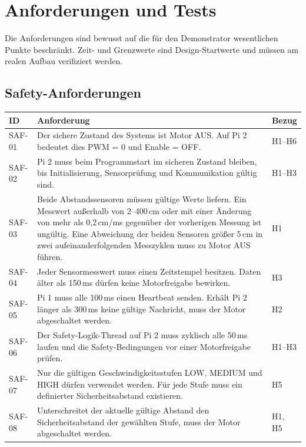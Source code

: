 \clearpage
\section{Anforderungen und Tests}
\label{sec:requirements}

Die Anforderungen sind bewusst auf die für den Demonstrator wesentlichen
Punkte beschränkt. Zeit- und Grenzwerte sind Design-Startwerte und müssen am
realen Aufbau verifiziert werden.

\subsection{Safety-Anforderungen}

\begin{table}[H]
    \centering
    \small
    \begin{tabularx}{\textwidth}{@{}p{1.5cm}Yp{2.0cm}@{}}
        \toprule
        \textbf{ID} & \textbf{Anforderung} & \textbf{Bezug} \\
        \midrule
        SAF-01 & Der sichere Zustand des Systems ist Motor AUS. Auf Pi 2 bedeutet dies PWM = 0 und Enable = OFF. & H1--H6 \\
        SAF-02 & Pi 2 muss beim Programmstart im sicheren Zustand bleiben, bis Initialisierung, Sensorprüfung und Kommunikation gültig sind. & H1--H3 \\
        SAF-03 & Beide Abstandssensoren müssen gültige Werte liefern. Ein Messwert außerhalb von 2--400\,cm oder mit einer Änderung von mehr als 0{,}2\,cm/ms gegenüber der vorherigen Messung ist ungültig. Eine Abweichung der beiden Sensoren größer 5\,cm in zwei aufeinanderfolgenden Messzyklen muss zu Motor AUS führen. & H1 \\
        SAF-04 & Jeder Sensormesswert muss einen Zeitstempel besitzen. Daten älter als 150\,ms dürfen keine Motorfreigabe bewirken. & H3 \\
        SAF-05 & Pi 1 muss alle 100\,ms einen Heartbeat senden. Erhält Pi 2 länger als 300\,ms keine gültige Nachricht, muss der Motor abgeschaltet werden. & H2 \\
        SAF-06 & Der Safety-Logik-Thread auf Pi 2 muss zyklisch alle 50\,ms laufen und die Safety-Bedingungen vor einer Motorfreigabe prüfen. & H1--H3 \\
        SAF-07 & Nur die gültigen Geschwindigkeitsstufen LOW, MEDIUM und HIGH dürfen verwendet werden. Für jede Stufe muss ein definierter Sicherheitsabstand existieren. & H5 \\
        SAF-08 & Unterschreitet der aktuelle gültige Abstand den Sicherheitsabstand der gewählten Stufe, muss der Motor abgeschaltet werden. & H1, H5 \\

\end{tabularx}
\end{table}
